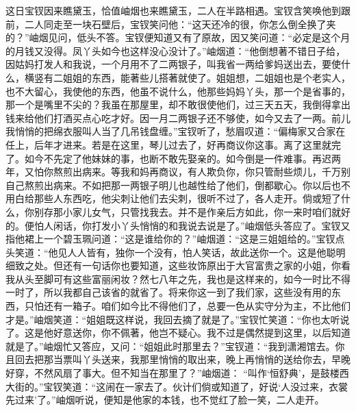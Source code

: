 \begin{parag}
    这日宝钗因来瞧黛玉，恰值岫烟也来瞧黛玉，二人在半路相遇。宝钗含笑唤他到跟前，二人同走至一块石壁后，宝钗笑问他：“这天还冷的很，你怎么倒全换了夹的？”岫烟见问，低头不答。宝钗便知道又有了原故，因又笑问道：“必定是这个月的月钱又没得。凤丫头如今也这样没心没计了。”岫烟道：“他倒想著不错日子给，因姑妈打发人和我说，一个月用不了二两银子，叫我省一两给爹妈送出去，要使什么，横竖有二姐姐的东西，能著些儿搭著就使了。姐姐想，二姐姐也是个老实人，也不大留心，我使他的东西，他虽不说什么，他那些妈妈丫头，那一个是省事的，那一个是嘴里不尖的？我虽在那屋里，却不敢很使他们，过三天五天，我倒得拿出钱来给他们打酒买点心吃才好。因一月二两银子还不够使，如今又去了一两。前儿我悄悄的把绵衣服叫人当了几吊钱盘缠。”宝钗听了，愁眉叹道：“偏梅家又合家在任上，后年才进来。若是在这里，琴儿过去了，好再商议你这事。离了这里就完了。如今不先定了他妹妹的事，也断不敢先娶亲的。如今倒是一件难事。再迟两年，又怕你熬煎出病来。等我和妈再商议，有人欺负你，你只管耐些烦儿，千万别自己熬煎出病来。不如把那一两银子明儿也越性给了他们，倒都歇心。你以后也不用白给那些人东西吃，他尖刺让他们去尖刺，很听不过了，各人走开。倘或短了什么，你别存那小家儿女气，只管找我去。并不是作亲后方如此，你一来时咱们就好的。便怕人闲话，你打发小丫头悄悄的和我说去说是了。”岫烟低头答应了。宝钗又指他裙上一个碧玉珮问道：“这是谁给你的？”岫烟道：“这是三姐姐给的。”宝钗点头笑道：“他见人人皆有，独你一个没有，怕人笑话，故此送你一个。这是他聪明细致之处。但还有一句话你也要知道，这些妆饰原出于大官富贵之家的小姐，你看我从头至脚可有这些富丽闲妆？然七八年之先，我也是这样来的，如今一时比不得一时了，所以我都自己该省的就省了。将来你这一到了我们家，这些没有用的东西，只怕还有一箱子。咱们如今比不得他们了，总要一色从实守分为主，不比他们才是。”岫烟笑道：“姐姐既这样说，我回去摘了就是了。”宝钗忙笑道：“你也太听说了。这是他好意送你，你不佩著，他岂不疑心。我不过是偶然提到这里，以后知道就是了。”岫烟忙又答应，又问：“姐姐此时那里去？”宝钗道：“我到潇湘馆去。你且回去把那当票叫丫头送来，我那里悄悄的取出来，晚上再悄悄的送给你去，早晚好穿，不然风扇了事大。但不知当在那里了？”岫烟道： “叫作‘恒舒典’，是鼓楼西大街的。”宝钗笑道：“这闹在一家去了。伙计们倘或知道了，好说‘人没过来，衣裳先过来’了。”岫烟听说，便知是他家的本钱，也不觉红了脸一笑，二人走开。
\end{parag}


